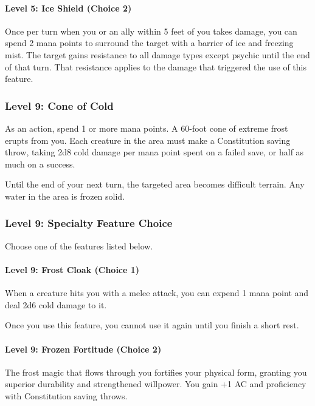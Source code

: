 \documentclass[12pt,letterpaper,twocolumn,openany,nodeprecatedcode,bg=none]{dndbook}
\begin{document}
\paragraph{Level 5: Ice Shield (Choice
2)}\label{level-5-ice-shield-choice-2}

Once per turn when you or an ally within 5 feet of you takes damage, you
can spend 2 mana points to surround the target with a barrier of ice and
freezing mist. The target gains resistance to all damage types except
psychic until the end of that turn. That resistance applies to the
damage that triggered the use of this feature.

\subsubsection{Level 9: Cone of Cold}\label{level-9-cone-of-cold}

As an action, spend 1 or more mana points. A 60-foot cone of extreme
frost erupts from you. Each creature in the area must make a
Constitution saving throw, taking 2d8 cold damage per mana point spent
on a failed save, or half as much on a success.

Until the end of your next turn, the targeted area becomes difficult
terrain. Any water in the area is frozen solid.

\subsubsection{Level 9: Specialty Feature
Choice}\label{level-9-specialty-feature-choice-1}

Choose one of the features listed below.

\paragraph{Level 9: Frost Cloak (Choice
1)}\label{level-9-frost-cloak-choice-1}

When a creature hits you with a melee attack, you can expend 1 mana
point and deal 2d6 cold damage to it.

Once you use this feature, you cannot use it again until you finish a
short rest.

\paragraph{Level 9: Frozen Fortitude (Choice
2)}\label{level-9-frozen-fortitude-choice-2}

The frost magic that flows through you fortifies your physical form,
granting you superior durability and strengthened willpower. You gain +1
AC and proficiency with Constitution saving throws.
\end{document}

